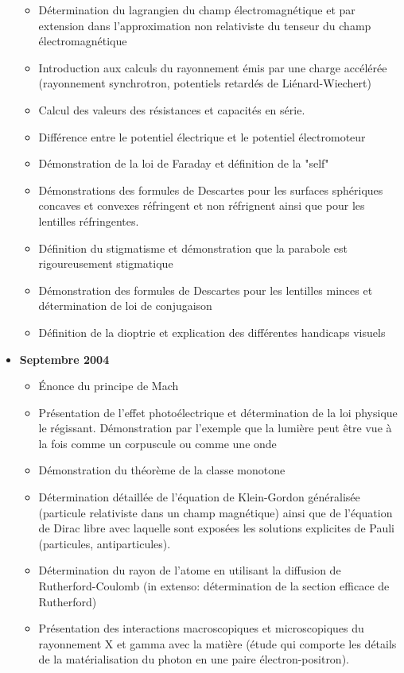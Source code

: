 \documentclass[12pt,a4paper,twoside,openright]{report}
\theoremstyle{definition}
\theoremstyle{itexmp}
\numberwithin{equation}{section}
\begin{document}
\begin{itemize}
\begin{itemize}[noitemsep]
				\item Détermination du lagrangien du champ électromagnétique et par extension dans l'approximation non relativiste du tenseur du champ électromagnétique
				\item Introduction aux calculs du rayonnement émis par une charge accélérée (rayonnement synchrotron, potentiels retardés de Liénard-Wiechert)
				\item Calcul des valeurs des résistances et capacités en série. 
				\item Différence entre le potentiel électrique et le potentiel électromoteur
				\item Démonstration de la loi de Faraday et définition de la "self"
				\item Démonstrations des formules de Descartes pour les surfaces sphériques concaves et convexes réfringent et non réfrignent ainsi que pour les lentilles réfringentes. 
				\item Définition du stigmatisme et démonstration que la parabole est rigoureusement stigmatique
				\item Démonstration des formules de Descartes pour les lentilles minces et détermination de loi de conjugaison
				\item Définition de la dioptrie et explication des différentes handicaps visuels
			\end{itemize}
		\item \textbf{Septembre 2004}
			\begin{itemize}[noitemsep]
				\item Énonce du principe de Mach
				\item Présentation de l'effet photoélectrique et détermination de la loi physique le régissant. Démonstration par l'exemple que la lumière peut être vue à la fois comme un corpuscule ou comme une onde
				\item Démonstration du théorème de la classe monotone
				\item Détermination détaillée de l'équation de Klein-Gordon généralisée (particule relativiste dans un champ magnétique) ainsi que de l'équation de Dirac libre avec laquelle sont exposées les solutions explicites de Pauli (particules, antiparticules). 
				\item Détermination du rayon de l'atome en utilisant la diffusion de Rutherford-Coulomb (in extenso: détermination de la section efficace de Rutherford)
				\item Présentation des interactions macroscopiques et microscopiques du rayonnement X et gamma avec la matière (étude qui comporte les détails de la matérialisation du photon en une paire électron-positron). 

\end{itemize}
\end{itemize}
\end{document}
